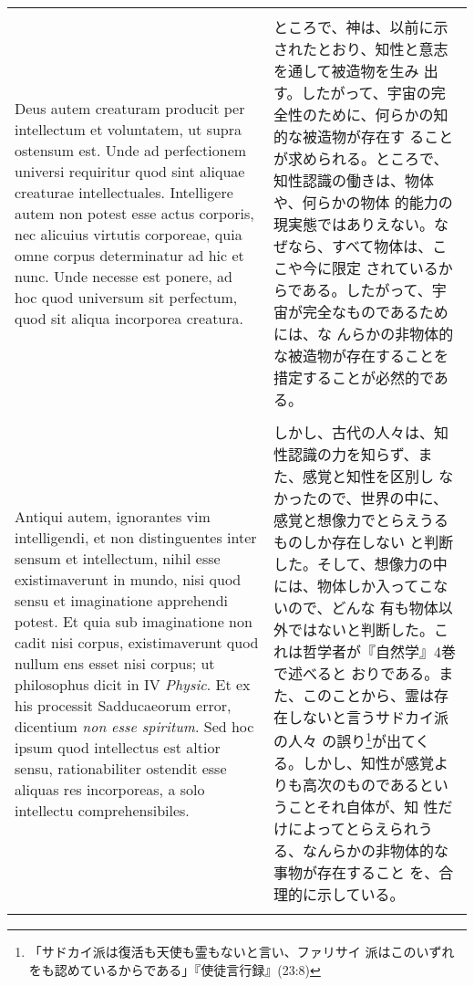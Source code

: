 \documentclass[10pt]{jsarticle} %
\begin{document}
\begin{longtable}{p{21em}p{21em}}
\\\\

Deus autem creaturam producit per intellectum et voluntatem, ut supra
ostensum est. Unde ad perfectionem universi requiritur quod sint
aliquae creaturae intellectuales. Intelligere autem non potest esse
actus corporis, nec alicuius virtutis corporeae, quia omne corpus
determinatur ad hic et nunc. Unde necesse est ponere, ad hoc quod
universum sit perfectum, quod sit aliqua incorporea creatura.

&

 ところで、神は、以前に示されたとおり、知性と意志を通して被造物を生み
 出す。したがって、宇宙の完全性のために、何らかの知的な被造物が存在す
 ることが求められる。ところで、知性認識の働きは、物体や、何らかの物体
 的能力の現実態ではありえない。なぜなら、すべて物体は、ここや今に限定
 されているからである。したがって、宇宙が完全なものであるためには、な
 んらかの非物体的な被造物が存在することを措定することが必然的である。

\\\\

Antiqui autem, ignorantes vim intelligendi, et non distinguentes inter
sensum et intellectum, nihil esse existimaverunt in mundo, nisi quod
sensu et imaginatione apprehendi potest. Et quia sub imaginatione non
cadit nisi corpus, existimaverunt quod nullum ens esset nisi corpus;
ut philosophus dicit in IV {\itshape Physic}. Et ex his processit
Sadducaeorum error, dicentium {\itshape non esse spiritum}. Sed hoc
ipsum quod intellectus est altior sensu, rationabiliter ostendit esse
aliquas res incorporeas, a solo intellectu comprehensibiles.

&

 しかし、古代の人々は、知性認識の力を知らず、また、感覚と知性を区別し
 なかったので、世界の中に、感覚と想像力でとらえうるものしか存在しない
 と判断した。そして、想像力の中には、物体しか入ってこないので、どんな
 有も物体以外ではないと判断した。これは哲学者が『自然学』4巻で述べると
 おりである。また、このことから、霊は存在しないと言うサドカイ派の人々
 の誤り\footnote{「サドカイ派は復活も天使も霊もないと言い、ファリサイ
 派はこのいずれをも認めているからである」『使徒言行録』(23:8)}が出てく
 る。しかし、知性が感覚よりも高次のものであるということそれ自体が、知
 性だけによってとらえられうる、なんらかの非物体的な事物が存在すること
 を、合理的に示している。

\\\\



\end{longtable}
\end{document}
